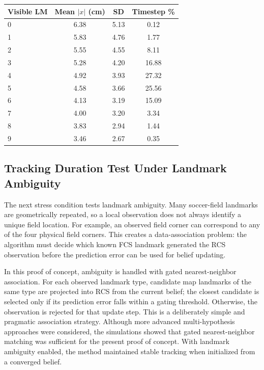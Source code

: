\begin{table}[!htbp]
\begin{minipage}[t]{0.49\linewidth}
\setlength{\tabcolsep}{3pt}
\begin{tabular}{lccc}
    \toprule
    Visible LM & Mean $|x|$ (cm) & SD & Timestep \% \\
    \midrule
    0 & 6.38 & 5.13 & 0.12 \\
    1 & 5.83 & 4.76 & 1.77 \\
    2 & 5.55 & 4.55 & 8.11 \\
    3 & 5.28 & 4.20 & 16.88 \\
    4 & 4.92 & 3.93 & 27.32 \\
    5 & 4.58 & 3.66 & 25.56 \\
    6 & 4.13 & 3.19 & 15.09 \\
    7 & 4.00 & 3.20 & 3.34 \\
    8 & 3.83 & 2.94 & 1.44 \\
    9 & 3.46 & 2.67 & 0.35 \\
    \bottomrule
\end{tabular}
    \end{minipage}
\end{table}

\FloatBarrier

\subsection{Tracking Duration Test Under Landmark Ambiguity}
\label{subsec:experiments-landmark-ambiguity}

The next stress condition tests landmark ambiguity. Many soccer-field landmarks are geometrically repeated, so a local observation does not always identify a unique field location. For example, an observed field corner can correspond to any of the four physical field corners. This creates a data-association problem: the algorithm must decide which known FCS landmark generated the RCS observation before the prediction error can be used for belief updating.

In this proof of concept, ambiguity is handled with gated nearest-neighbor association. For each observed landmark type, candidate map landmarks of the same type are projected into RCS from the current belief; the closest candidate is selected only if its prediction error falls within a gating threshold. Otherwise, the observation is rejected for that update step. This is a deliberately simple and pragmatic association strategy. Although more advanced multi-hypothesis approaches were considered, the simulations showed that gated nearest-neighbor matching was sufficient for the present proof of concept. With landmark ambiguity enabled, the method maintained stable tracking when initialized from a converged belief.


